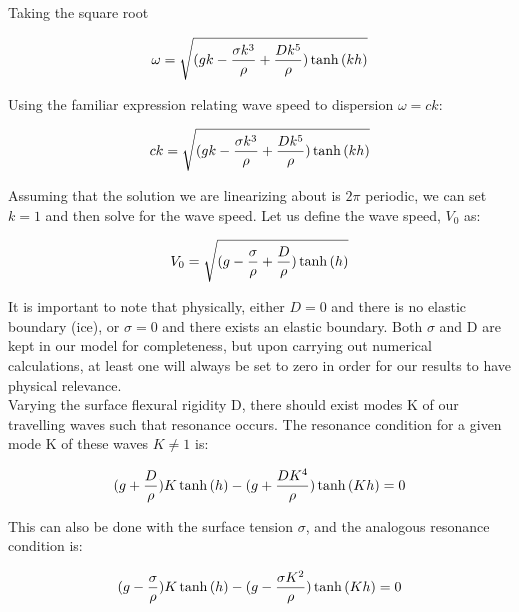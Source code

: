 \documentclass{article}
\begin{document}
Taking the square root

\vspace{10}

\begin{equation} \label{dispersion}
 \omega = \sqrt{(gk - \frac{\sigma k^3}{\rho} + \frac{D k^5}{\rho})\tanh{(kh)}}  
 \\
\end{equation}

Using the familiar expression relating wave speed to dispersion \(\omega = ck\):

\begin{equation} \label{V}
 ck = \sqrt{(gk - \frac{\sigma k^3}{\rho} + \frac{D k^5}{\rho})\tanh{(kh)}}
 \\
\end{equation}

Assuming that the solution we are linearizing about is \(2 \pi\) periodic, we can set \(k = 1\) and then solve for the wave speed. Let us define the wave speed, \(V_{0}\) as:

\begin{equation} \label{V}
 V_{0} = \sqrt{(g - \frac{\sigma }{\rho} + \frac{D }{\rho})\tanh{(h)}}  
 \\
\end{equation}

It is important to note that physically, either \(D = 0\) and there is no elastic boundary (ice), or \(\sigma = 0\) and there exists an elastic boundary. Both \(\sigma\) and D are kept in our model for completeness, but upon carrying out numerical calculations, at least one will always be set to zero in order for our results to have physical relevance.\\

Varying the surface flexural rigidity D, there should exist modes K of our travelling waves such that  resonance occurs. The resonance condition for a given mode K of these waves \(K \neq 1\) is:

\begin{equation} \label{resonance}
(g + \frac{D}{\rho})K\tanh{(h)} - (g + \frac{DK^4}{\rho})\tanh{(Kh)} = 0 
 \\
\end{equation}

This can also be done with the surface tension \(\sigma\), and the analogous resonance condition is:

\begin{equation} \label{resonancesigma}
(g - \frac{\sigma}{\rho})K\tanh{(h)} - (g - \frac{\sigma K^2}{\rho})\tanh{(Kh)} = 0 
 \\
\end{equation}
\end{document}
